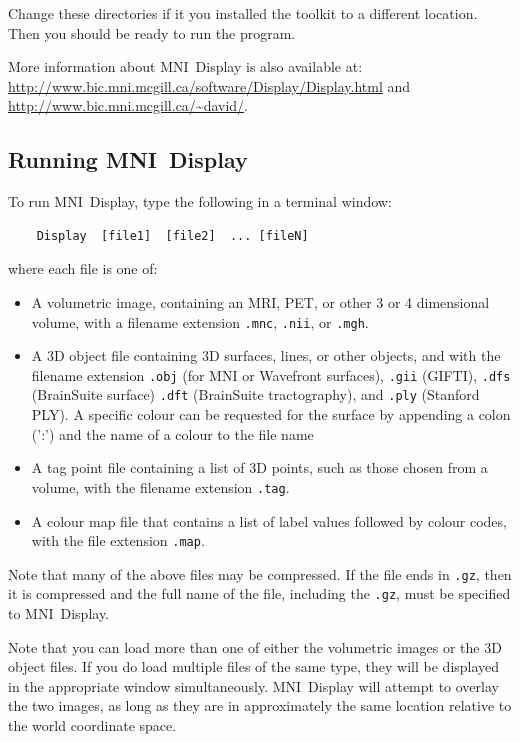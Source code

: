 \documentclass[11pt,letterpaper]{article}
\newcommand{\ident}[1]{{\tt #1}}
\newcommand{\display}{\mbox{MNI Display}}
\begin{document}
Change these directories if it you installed the toolkit to a
different location. Then you should be ready to run the program.

More information about \display{} is also available at:
\url{http://www.bic.mni.mcgill.ca/software/Display/Display.html}
and
\url{http://www.bic.mni.mcgill.ca/~david/}.

\subsection{Running \display{}}

To run \display{}, type the following in a terminal window:

\begin{verbatim}
    Display  [file1]  [file2]  ... [fileN]
\end{verbatim}

where each file is one of:

\vspace{.5cm}

\begin{itemize}
\item A volumetric image, containing an MRI, PET, or other 3 or 4 dimensional volume, with a filename extension \ident{.mnc}, \ident{.nii}, or \ident{.mgh}.

\item A 3D object file containing 3D surfaces, lines, or other
 objects, and with the filename extension \ident{.obj} (for MNI or
 Wavefront surfaces), \ident{.gii} (GIFTI), \ident{.dfs} (BrainSuite surface)
 \ident{.dft} (BrainSuite tractography), and \ident{.ply} (Stanford PLY). 
A specific colour can be requested for the surface by appending a colon (':') and the name of a colour to the file name 

\item A tag point file containing a list of 3D points, such as those chosen from a volume, with the filename extension \ident{.tag}.

\item A colour map file that contains a list of label values followed by colour 
codes, with the file extension \ident{.map}.
\end{itemize}

Note that many of the above files may be compressed. If the file ends in
\ident{.gz}, then it is compressed and the full name of the file, including the
\ident{.gz}, must be specified to \display{}.

Note that you can load more than one of either the volumetric images or
the 3D object files. If you do load multiple files of the same type,
they will be displayed in the appropriate window
simultaneously. \display{} will attempt to overlay the two images, as
long as they are in approximately the same location relative to the
world coordinate space.
\end{document}
